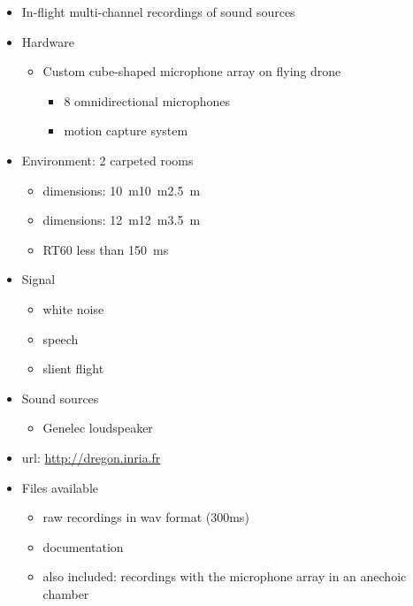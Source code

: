 \documentclass[14pt, oneside]{extarticle}
\begin{document}
\begin{itemize}

\item In-flight multi-channel recordings of sound sources \cite{strauss2018dregon}

\item Hardware
	\begin{itemize}
	\item Custom cube-shaped microphone array on flying drone
		\begin{itemize}
		\item 8 omnidirectional microphones
		\item motion capture system 
		\end{itemize}
	\end{itemize}

\item Environment: 2 carpeted rooms
	\begin{itemize}
	\item dimensions: \SI{10}{\metre}\texttimes\SI{10}{\metre}\texttimes\SI{2.5}{\metre}
	\item dimensions: \SI{12}{\metre}\texttimes\SI{12}{\metre}\texttimes\SI{3.5}{\metre}
	\item RT60 less than \SI{150}{\milli\second}
	\end{itemize}

\item Signal
	\begin{itemize}
	\item white noise
	\item speech
	\item slient flight
	\end{itemize}

\item Sound sources
	\begin{itemize}
	\item Genelec loudspeaker
	\end{itemize}

\item url: \href{http://dregon.inria.fr}{http://dregon.inria.fr} 

\item Files available
	\begin{itemize}
	\item raw recordings in wav format (300ms)
	\item documentation
	\item also included: recordings with the microphone array in an anechoic chamber
	\end{itemize}

\end{itemize}
\end{document}
